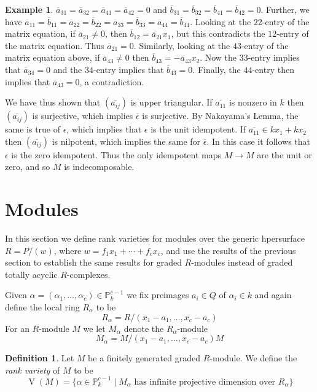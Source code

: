 \documentclass{amsart}[11pt]
\newcommand{\V}{\operatorname{V}}
\numberwithin{equation}{section}
\theoremstyle{plain}
\newtheorem*{Main Theorem}{Main Theorem}
\theoremstyle{definition}
\newtheorem{definition}[theorem]{Definition}
\newtheorem{example}[theorem]{Example}
\theoremstyle{remark}
\numberwithin{equation}{theorem}
\begin{document}
\begin{example}
$\overline a_{31}=\overline a_{32}=\overline a_{41}=\overline a_{42}=0$ and 
$\overline b_{31}=\overline b_{32}=\overline b_{41}=\overline b_{42}=0$. Further, we have
$\overline a_{11}=\overline b_{11}=\overline a_{22}=\overline b_{22}=\overline a_{33}=\overline b_{33}=\overline a_{44}=\overline b_{44}$. Looking at the $22$-entry of the matrix equation, if 
$\overline a_{21}\ne 0$, then $\overline b_{12}=\overline a_{21}x_1$, but this contradicts the $12$-entry of the matrix equation. Thus $\overline a_{21}=0$.  Similarly, looking at the $43$-entry of the matrix equation above, if $\overline a_{43}\ne 0$ then $\overline b_{43}=-\overline a_{43}x_2$. Now the $33$-entry implies that $\overline a_{34}=0$ and the $34$-entry implies that 
$\overline b_{43}=0$. Finally, the $44$-entry then implies that $\overline a_{43}=0$, a contradiction.  

We have thus shown that $(\overline{a_{ij}})$ is upper triangular.  If $\overline{a_{11}}$ is nonzero in $k$ then $(\overline{a_{ij}})$ is surjective, which implies $\overline\epsilon$ is surjective.  By Nakayama's Lemma, the same is true of $\epsilon$, which implies that $\epsilon$ is the unit idempotent. If $\overline{a_{11}}\in kx_1+kx_2$ then $(\overline{a_{ij}})$ is nilpotent, which implies the same for $\overline\epsilon$.  In this case it follows that $\epsilon$ is the zero idempotent.  Thus the only idempotent maps $M\to M$ are the unit or zero, and so $M$ is indecomposable.
\end{example}





\section{Modules}\label{modules}
In this section we define rank varieties for modules over the generic hpersurface
$R=P/(w)$, where $w=f_1x_1+\cdots +f_cx_c$, and use the results of the previous section to establish the same results for graded $R$-modules instead of graded totally acyclic $R$-complexes.

Given $\alpha=(\alpha_1,\dots,\alpha_c)\in\mathbb P^{c-1}_k$ we fix preimages $a_i\in Q$ of
$\alpha_i\in k$ and again define the local ring $R_\alpha$ to be
\[
R_\alpha=R/(x_1-a_1,\dots,x_c-a_c)
\]
For an $R$-module $M$ we let $M_\alpha$ denote the $R_\alpha$-module
\[
M_\alpha=M/(x_1-a_1,\dots,x_c-a_c)M
\]

\begin{definition} Let $M$ be a finitely generated graded $R$-module. We define the \emph{rank variety}
of $M$ to be
\[
\V(M)=\{\alpha\in\mathbb P^{c-1}_k\mid M_\alpha\text{ has infinite projective dimension over 
} R_\alpha\}
\]
\end{definition}
\end{document}
